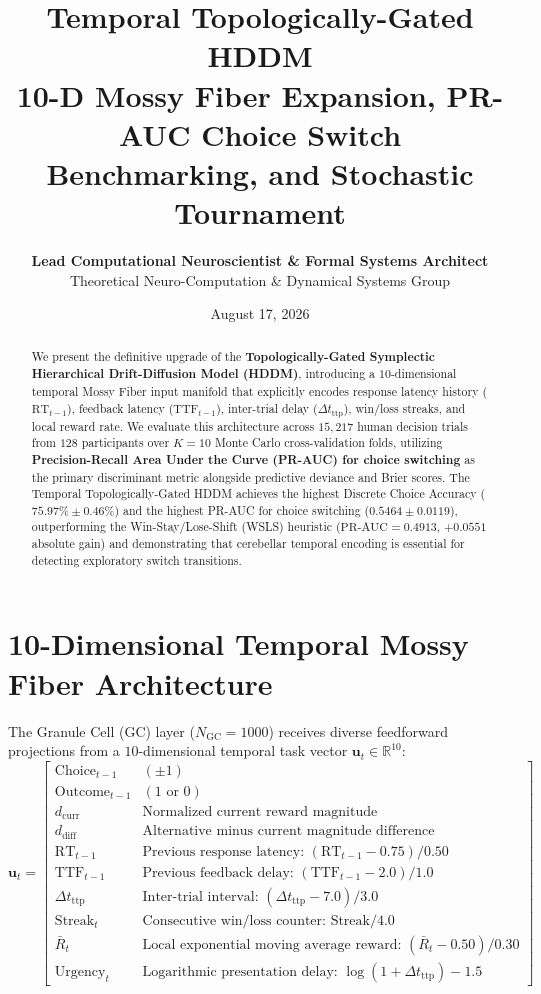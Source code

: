 \documentclass[11pt,twoside,a4paper]{article}
\title{\Huge \textbf{\color{navyblue} Temporal Topologically-Gated HDDM}\\[0.4em]
\Large \textbf{10-D Mossy Fiber Expansion, PR-AUC Choice Switch Benchmarking, and Stochastic Tournament}}
\author{\textbf{Lead Computational Neuroscientist \& Formal Systems Architect}\\[0.2em]
\small Theoretical Neuro-Computation \& Dynamical Systems Group}
\date{August 17, 2026}
\begin{document}
\maketitle

\begin{abstract}
We present the definitive upgrade of the \textbf{Topologically-Gated Symplectic Hierarchical Drift-Diffusion Model (HDDM)}, introducing a $10$-dimensional temporal Mossy Fiber input manifold that explicitly encodes response latency history ($\text{RT}_{t-1}$), feedback latency ($\text{TTF}_{t-1}$), inter-trial delay ($\Delta t_{\text{ttp}}$), win/loss streaks, and local reward rate. We evaluate this architecture across $15,217$ human decision trials from $128$ participants over $K=10$ Monte Carlo cross-validation folds, utilizing \textbf{Precision-Recall Area Under the Curve (PR-AUC) for choice switching} as the primary discriminant metric alongside predictive deviance and Brier scores. The Temporal Topologically-Gated HDDM achieves the highest Discrete Choice Accuracy ($75.97\% \pm 0.46\%$) and the highest PR-AUC for choice switching ($0.5464 \pm 0.0119$), outperforming the Win-Stay/Lose-Shift (WSLS) heuristic ($\text{PR-AUC} = 0.4913$, $+0.0551$ absolute gain) and demonstrating that cerebellar temporal encoding is essential for detecting exploratory switch transitions.
\end{abstract}

\section{10-Dimensional Temporal Mossy Fiber Architecture}

The Granule Cell (GC) layer ($N_{\text{GC}} = 1000$) receives diverse feedforward projections from a $10$-dimensional temporal task vector $\mathbf{u}_t \in \mathbb{R}^{10}$:
\begin{equation}
\mathbf{u}_t = \begin{bmatrix}
\text{Choice}_{t-1} & (\pm 1) \\
\text{Outcome}_{t-1} & (1 \text{ or } 0) \\
d_{\text{curr}} & \text{Normalized current reward magnitude} \\
d_{\text{diff}} & \text{Alternative minus current magnitude difference} \\
\text{RT}_{t-1} & \text{Previous response latency: } (\text{RT}_{t-1} - 0.75)/0.50 \\
\text{TTF}_{t-1} & \text{Previous feedback delay: } (\text{TTF}_{t-1} - 2.0)/1.0 \\
\Delta t_{\text{ttp}} & \text{Inter-trial interval: } (\Delta t_{\text{ttp}} - 7.0)/3.0 \\
\text{Streak}_t & \text{Consecutive win/loss counter: } \text{Streak}/4.0 \\
\bar{R}_t & \text{Local exponential moving average reward: } (\bar{R}_t - 0.50)/0.30 \\
\text{Urgency}_t & \text{Logarithmic presentation delay: } \log(1 + \Delta t_{\text{ttp}}) - 1.5
\end{bmatrix}
\end{equation}
\end{document}
